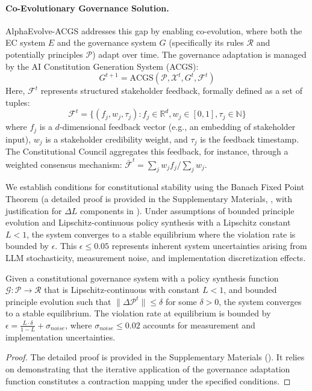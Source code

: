 \documentclass[manuscript,screen,review,anonymous,9pt]{acmart}
\begin{document}
\paragraph{Co-Evolutionary Governance Solution.} AlphaEvolve-ACGS addresses this gap by enabling co-evolution, where both the EC system $E$ and the governance system $G$ (specifically its rules $\mathcal{R}$ and potentially principles $\mathcal{P}$) adapt over time. The governance adaptation is managed by the AI Constitution Generation System (ACGS):
\[G^{t+1} = \text{ACGS}(\mathcal{P}, \mathcal{X}^t, G^t, \mathcal{F}^t)\]
Here, $\mathcal{F}^t$ represents structured stakeholder feedback, formally defined as a set of tuples:
\[\mathcal{F}^t = \{(f_j, w_j, \tau_j) : f_j \in \mathbb{R}^d, w_j \in [0,1], \tau_j \in \mathbb{N}\}\]
where $f_j$ is a $d$-dimensional feedback vector (e.g., an embedding of stakeholder input), $w_j$ is a stakeholder credibility weight, and $\tau_j$ is the feedback timestamp. The Constitutional Council aggregates this feedback, for instance, through a weighted consensus mechanism: $\bar{\mathcal{F}}^t = \sum_{j} w_j f_j / \sum_{j} w_j$.

We establish conditions for constitutional stability using the Banach Fixed Point Theorem (a detailed proof is provided in the Supplementary Materials, , with justification for $\Delta L$ components in ). Under assumptions of bounded principle evolution and Lipschitz-continuous policy synthesis with a Lipschitz constant $L < 1$, the system converges to a stable equilibrium where the violation rate is bounded by $\epsilon$. This $\epsilon \leq 0.05$ represents inherent system uncertainties arising from LLM stochasticity, measurement noise, and implementation discretization effects.

\begin{theorem}
\label{thm:constitutional_stability}
Given a constitutional governance system with a policy synthesis function $\mathcal{G}: \mathcal{P} \rightarrow \mathcal{R}$ that is Lipschitz-continuous with constant $L < 1$, and bounded principle evolution such that $\|\Delta \mathcal{P}^t\| \leq \delta$ for some $\delta > 0$, the system converges to a stable equilibrium. The violation rate at equilibrium is bounded by $\epsilon = \frac{L \cdot \delta}{1-L} + \sigma_{noise}$, where $\sigma_{noise} \leq 0.02$ accounts for measurement and implementation uncertainties.
\end{theorem}
\begin{proof}
The detailed proof is provided in the Supplementary Materials (). It relies on demonstrating that the iterative application of the governance adaptation function constitutes a contraction mapping under the specified conditions.
\end{proof}
\end{document}
